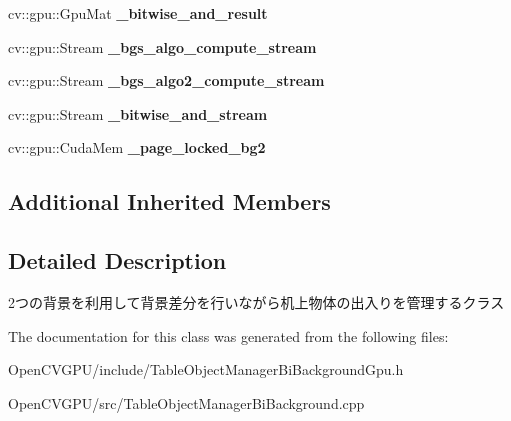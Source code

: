\begin{DoxyCompactItemize}
\hypertarget{classskl_1_1gpu_1_1_table_object_manager_bi_background_abc1c269ab3a63615e7c99bc1a73d9dbd}{}\label{classskl_1_1gpu_1_1_table_object_manager_bi_background_abc1c269ab3a63615e7c99bc1a73d9dbd} 
cv\+::gpu\+::\+Gpu\+Mat {\bfseries \+\_\+bitwise\+\_\+and\+\_\+result}
\item 
\hypertarget{classskl_1_1gpu_1_1_table_object_manager_bi_background_a4356b991069ee2a14c881a7c6b1056eb}{}\label{classskl_1_1gpu_1_1_table_object_manager_bi_background_a4356b991069ee2a14c881a7c6b1056eb} 
cv\+::gpu\+::\+Stream {\bfseries \+\_\+bgs\+\_\+algo\+\_\+compute\+\_\+stream}
\item 
\hypertarget{classskl_1_1gpu_1_1_table_object_manager_bi_background_ade7991cfdb5440ad179e5a7aac81f4b6}{}\label{classskl_1_1gpu_1_1_table_object_manager_bi_background_ade7991cfdb5440ad179e5a7aac81f4b6} 
cv\+::gpu\+::\+Stream {\bfseries \+\_\+bgs\+\_\+algo2\+\_\+compute\+\_\+stream}
\item 
\hypertarget{classskl_1_1gpu_1_1_table_object_manager_bi_background_aad147098dd2c5a4f0fd8264371523a21}{}\label{classskl_1_1gpu_1_1_table_object_manager_bi_background_aad147098dd2c5a4f0fd8264371523a21} 
cv\+::gpu\+::\+Stream {\bfseries \+\_\+bitwise\+\_\+and\+\_\+stream}
\item 
\hypertarget{classskl_1_1gpu_1_1_table_object_manager_bi_background_a6f7b46a1287a4b649049aada7fb21833}{}\label{classskl_1_1gpu_1_1_table_object_manager_bi_background_a6f7b46a1287a4b649049aada7fb21833} 
cv\+::gpu\+::\+Cuda\+Mem {\bfseries \+\_\+page\+\_\+locked\+\_\+bg2}
\end{DoxyCompactItemize}
\subsection*{Additional Inherited Members}


\subsection{Detailed Description}
2つの背景を利用して背景差分を行いながら机上物体の出入りを管理するクラス 

The documentation for this class was generated from the following files\+:\begin{DoxyCompactItemize}
\item 
Open\+C\+V\+G\+P\+U/include/Table\+Object\+Manager\+Bi\+Background\+Gpu.\+h\item 
Open\+C\+V\+G\+P\+U/src/Table\+Object\+Manager\+Bi\+Background.\+cpp\end{DoxyCompactItemize}
